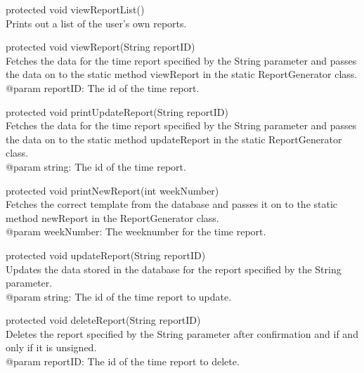 \documentclass[a4paper]{article}
\begin{document}
\vspace{5mm}
\begin{hangparas}{1.5em}{1}
protected void viewReportList()\\
Prints out a list of the user’s own reports.
\end{hangparas}

\vspace{5mm}
\begin{hangparas}{1.5em}{1}
protected void viewReport(String reportID)\\
Fetches the data for the time report specified by the String parameter and passes the data on to the static method viewReport in the static ReportGenerator class.\\
@param reportID: The id of the time report.
\end{hangparas}

\vspace{5mm}
\begin{hangparas}{1.5em}{1}
protected void printUpdateReport(String reportID)\\
Fetches the data for the time report specified by the String parameter and passes the data on to the static method updateReport in the static ReportGenerator class.\\
@param string: The id of the time report.
\end{hangparas}

\vspace{5mm}
\begin{hangparas}{1.5em}{1}
protected void printNewReport(int weekNumber)\\
Fetches the correct template from the database and passes it on to the static method newReport in the ReportGenerator class.\\
@param weekNumber: The weeknumber for the time report.
\end{hangparas}

\vspace{5mm}
\begin{hangparas}{1.5em}{1}
protected void updateReport(String reportID)\\
Updates the data stored in the database for the report specified by the String parameter.\\
@param string: The id of the time report to update.
\end{hangparas}

\vspace{5mm}
\begin{hangparas}{1.5em}{1}
protected void deleteReport(String reportID)\\
Deletes the report specified by the String parameter after confirmation and if and only if it is unsigned.\\
@param reportID: The id of the time report to delete.
\end{hangparas}
\end{document}
